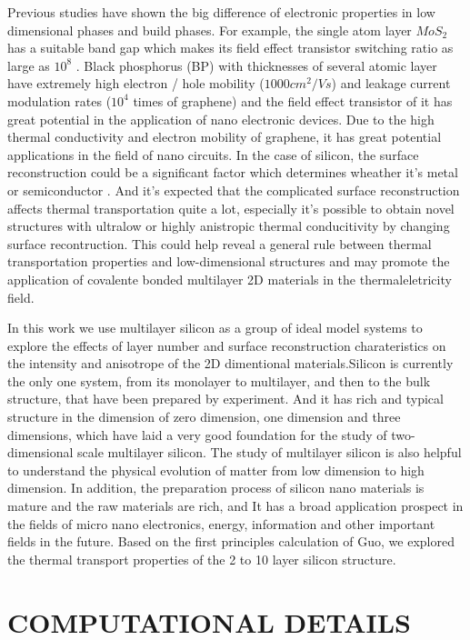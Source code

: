 \documentclass[%
 reprint,
 amsmath,amssymb,
 aps,
 prb,
]{revtex4-1}
\begin{document}
Previous studies have shown the big difference of electronic properties in low dimensional phases and build phases. For example, the single atom layer $MoS_2$ has a suitable band gap which makes its field effect transistor switching ratio as large as $10^8$ \cite{Li_Yu2014}. Black phosphorus (BP) with thicknesses of several atomic layer have extremely high electron / hole mobility ($1000cm^2/Vs$) and leakage current modulation rates ($10^4$ times of graphene) and the field effect transistor of it has great potential in the application of nano electronic devices\cite{RadisavljevicB2011}. Due to the high thermal conductivity and electron mobility of graphene, it has great potential applications in the field of nano circuits\cite{Chen2008,Balandin2008}. In the case of silicon, the surface reconstruction could be a significant factor which determines wheather it's metal or semiconductor \cite{Guo2015Structural}. And it's expected that the complicated surface reconstruction affects thermal transportation quite a lot, especially it's possible to obtain novel structures with ultralow or highly anistropic thermal conducitivity by changing surface recontruction. This could help reveal a general rule between thermal transportation properties and low-dimensional structures and may promote the application of covalente bonded multilayer 2D materials in the thermaleletricity field.

In this work we use multilayer silicon as a group of  ideal model systems to explore the effects of layer number and  surface reconstruction charateristics on the intensity and anisotrope of the 2D dimentional materials.Silicon  is currently the only one system, from its monolayer to multilayer, and then to the bulk structure, that have been prepared by experiment. And it has rich and typical structure in the dimension of zero dimension, one dimension and three dimensions, which have laid a very good foundation for the study of two-dimensional scale multilayer silicon. The study of multilayer silicon is also helpful to understand the physical evolution of matter from low dimension to high dimension. In addition, the preparation process of silicon nano materials is mature and the raw materials are rich, and It has a broad application prospect in the fields of micro nano electronics, energy, information and other important fields in the future. Based on the first principles calculation of Guo\cite{Guo2015Structural}, we explored the thermal transport properties of the 2 to 10 layer silicon structure.


\section{COMPUTATIONAL DETAILS}
\end{document}
